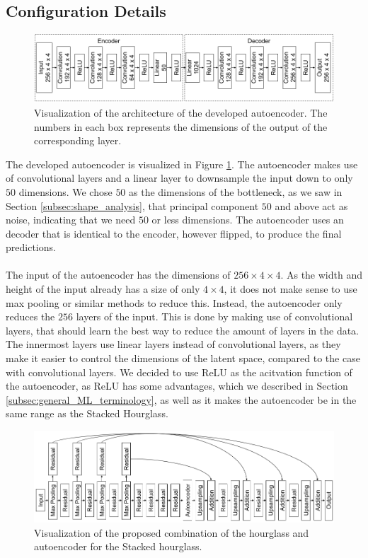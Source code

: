 \documentclass[./main.tex]{subfiles}
\begin{document}
\subsection{Configuration Details}\label{subsec:improv_conf_details}
\begin{figure}[htbp]
    \centering
    \includegraphics[width = \textwidth]{entities/Ae_model.png}
    \caption{Visualization of the architecture of the developed autoencoder. The numbers in each box represents the dimensions of the output of the corresponding layer.}
    \label{fig:AE_model}
\end{figure}
\noindent The developed autoencoder is visualized in Figure \ref{fig:AE_model}. The autoencoder makes use of convolutional layers and a linear layer to downsample the input down to only $50$ dimensions. We chose $50$ as the dimensions of the bottleneck, as we saw in Section \ref{subsec:shape_analysis}, that principal component $50$ and above act as noise, indicating that we need $50$ or less dimensions. The autoencoder uses an decoder that is identical to the encoder, however flipped, to produce the final predictions. 
\\
\\
The input of the autoencoder has the dimensions of $256 \times 4 \times 4$. As the width and height of the input already has a size of only $4 \times 4$, it does not make sense to use max pooling or similar methods to reduce this. Instead, the autoencoder only reduces the $256$ layers of the input. This is done by making use of convolutional layers, that should learn the best way to reduce the amount of layers in the data.  The innermost layers use linear layers instead of convolutional layers, as they make it easier to control the dimensions of the latent space, compared to the case with convolutional layers. We decided to use ReLU as the acitvation function of the autoencoder, as ReLU has some advantages, which we described in Section \ref{subsec:general_ML_terminology}, as well as it makes the autoencoder be in the same range as the Stacked Hourglass.
\\
\begin{figure}[htbp]
    \centering
    \includegraphics[width = \textwidth]{entities/SHG_AE.png}
    \caption{Visualization of the proposed combination of the hourglass and autoencoder for the Stacked hourglass.}
    \label{fig:SHG_AE}
\end{figure}
\end{document}

